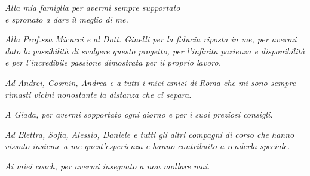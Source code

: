 \vspace*{5cm}
\begin{flushright}
\textit{
Alla mia famiglia per avermi sempre supportato\\e spronato a dare il meglio di me.}


\textit{
Alla Prof.ssa Micucci e al Dott. Ginelli per la fiducia riposta in me, per avermi dato la possibilità di svolgere questo progetto, per l'infinita pazienza e disponibilità e per l'incredibile passione dimostrata per il proprio lavoro.
}


\textit{
Ad Andrei, Cosmin, Andrea e a tutti i miei amici di Roma che mi sono sempre rimasti vicini nonostante la distanza che ci separa.
}

\textit{
A Giada, per avermi sopportato ogni giorno e per i suoi preziosi consigli.
}

\textit{
Ad Elettra, Sofia, Alessio, Daniele e tutti gli altri compagni di corso che hanno vissuto insieme a me quest'esperienza e hanno contribuito a renderla speciale.
}

\textit{
Ai miei coach, per avermi insegnato a non mollare mai.
}
\end{flushright}
\newpage\null\thispagestyle{empty}\newpage
\restoregeometry
